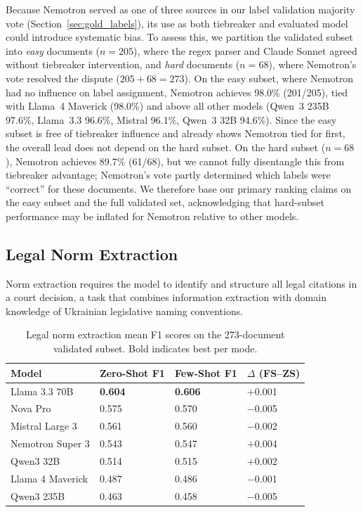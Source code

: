 \documentclass[11pt,a4paper]{article}
\begin{document}
Because Nemotron served as one of three sources in our label validation majority vote (Section~\ref{sec:gold_labels}), its use as both tiebreaker and evaluated model could introduce systematic bias. To assess this, we partition the validated subset into \emph{easy} documents ($n{=}205$), where the regex parser and Claude Sonnet agreed without tiebreaker intervention, and \emph{hard} documents ($n{=}68$), where Nemotron's vote resolved the dispute ($205 + 68 = 273$). On the easy subset, where Nemotron had no influence on label assignment, Nemotron achieves 98.0\% (201/205), tied with Llama~4 Maverick (98.0\%) and above all other models (Qwen~3 235B 97.6\%, Llama~3.3 96.6\%, Mistral 96.1\%, Qwen~3 32B 94.6\%). Since the easy subset is free of tiebreaker influence and already shows Nemotron tied for first, the overall lead does not depend on the hard subset. On the hard subset ($n{=}68$), Nemotron achieves 89.7\% (61/68), but we cannot fully disentangle this from tiebreaker advantage; Nemotron's vote partly determined which labels were ``correct'' for these documents. We therefore base our primary ranking claims on the easy subset and the full validated set, acknowledging that hard-subset performance may be inflated for Nemotron relative to other models.

\subsection{Legal Norm Extraction}
\label{sec:results_norms}

Norm extraction requires the model to identify and structure all legal citations in a court decision, a task that combines information extraction with domain knowledge of Ukrainian legislative naming conventions.

\begin{table}[t]
\centering
\caption{Legal norm extraction mean F1 scores on the 273-document validated subset. Bold indicates best per mode.}
\label{tab:norm_extraction}
\begin{tabular}{lR{2.0cm}R{2.0cm}R{2.0cm}}
\toprule
\textbf{Model} & \textbf{Zero-Shot F1} & \textbf{Few-Shot F1} & \textbf{$\Delta$ (FS--ZS)} \\
\midrule
Llama 3.3 70B     & \textbf{0.604} & \textbf{0.606} & $+$0.001 \\
Nova Pro          & 0.575          & 0.570          & $-$0.005 \\
Mistral Large 3   & 0.561          & 0.560          & $-$0.002 \\
Nemotron Super 3  & 0.543          & 0.547          & $+$0.004 \\
Qwen3 32B         & 0.514          & 0.515          & $+$0.002 \\
Llama 4 Maverick  & 0.487          & 0.486          & $-$0.001 \\
Qwen3 235B        & 0.463          & 0.458          & $-$0.005 \\
\bottomrule
\end{tabular}
\end{table}
\end{document}
